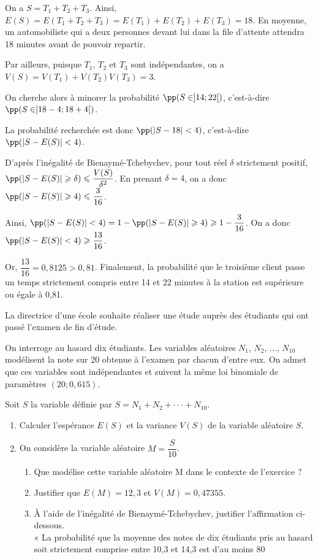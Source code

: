 \documentclass[11pt,fleqn, openany]{book} %
\begin{document}
\begin{solution}
On a $S=T_1+T_2+T_3$. Ainsi, $E(S)=E(T_1+T_2+T_3)=E(T_1)+E(T_2)+E(T_3)=18$. En moyenne, un automobiliste qui a deux personnes devant lui dans la file d'attente attendra 18 minutes avant de pouvoir repartir.

Par ailleurs, puisque $T_1$, $T_2$ et $T_3$ sont indépendantes, on a $V(S)=V(T_1)+V(T_2)V(T_3)=3$.

On cherche alors à minorer la probabilité $\pp(S \in ]14;22[)$, c'est-à-dire $\pp(S \in ]18-4;18+4[)$.

La probabilité recherchée est donc $\pp(|S-18|<4)$, c'est-à-dire $\pp(|S-E(S)|<4)$.

D'après l'inégalité de Bienaymé-Tchebychev, pour tout réel $\delta$ strictement positif, $\pp(|S-E(S)|\geqslant \delta) \leqslant \dfrac{V(S)}{\delta ^2}$. En prenant $\delta=4$, on a donc $\pp(|S-E(S)|\geqslant 4)\leqslant \dfrac{3}{16}$.

Ainsi, $\pp(|S-E(S)|<4)=1-\pp(|S-E(S)|\geqslant 4)\geqslant 1- \dfrac{3}{16}$. On a donc $\pp(|S-E(S)|<4)\geqslant \dfrac{13}{16}$. 

Or, $\dfrac{13}{16}=0,8125>0,81$. Finalement, la probabilité que le troisième client passe un temps strictement compris entre 14 et 22 minutes à la station est supérieure ou égale à 0,81.
\end{solution}

\begin{exercise}[topic=lgn03, subtitle={(Métropole 2024, jour 2)}]
La directrice d'une école souhaite réaliser une étude auprès des étudiants qui ont passé l'examen de fin d'étude.

On interroge au hasard dix étudiants. Les variables aléatoires $N_1$, $N_2$, ..., $N_{10}$ modélisent la note sur 20 obtenue à l'examen par chacun d'entre eux. On admet que ces variables sont indépendantes et suivent la même loi binomiale de paramètres $(20 ; 0,615)$.

Soit $S$ la variable définie par $S = N_1 + N_2 +··· + N_{10}$.
\begin{enumerate}
\item Calculer l'espérance $E(S)$ et la variance $V(S)$ de la variable aléatoire $S$.
\item On considère la variable aléatoire $M=\dfrac{S}{10}$.
\begin{enumerate}
\item Que modélise cette variable aléatoire M dans le contexte de l'exercice ?
\item Justifier que $E(M) = 12,3$ et $V (M) = 0,47355$.
\item À l'aide de l'inégalité de Bienaymé-Tchebychev, justifier l'affirmation ci-dessous. \\ « La probabilité que la moyenne des notes de dix étudiants pris au hasard soit
strictement comprise entre 10,3 et 14,3 est d'au moins 80%
\end{enumerate}
\end{enumerate}
\end{exercise}
\end{document}
